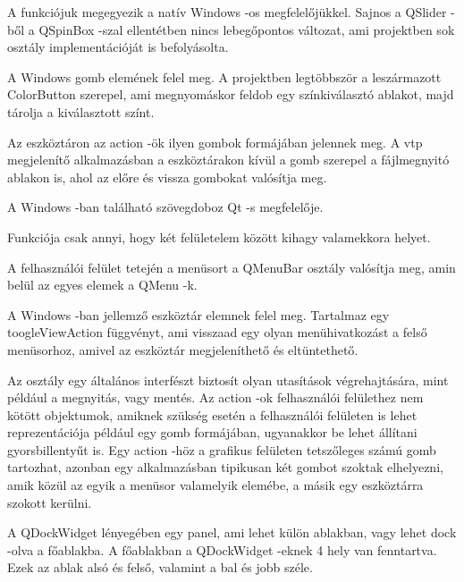 \begin{sloppypar}
\begin{description}[font=\normalfont\itshape\space]
\item [QLabel, QSlider, QSpinBox, QCheckBox, QComboBox:] 
A funkciójuk megegyezik a natív Windows -os megfelelőjükkel. 
Sajnos a QSlider -ből a QSpinBox -szal ellentétben nincs lebegőpontos változat, 
ami projektben sok osztály implementációját is befolyásolta.
\item [QPushButton:] 
A Windows gomb elemének felel meg. 
A projektben legtöbbször a leszármazott {\ttfamily ColorButton} szerepel, 
ami megnyomáskor feldob egy színkiválasztó ablakot, 
majd tárolja a kiválasztott színt.
\item [QToolButton:] 
Az eszköztáron az action -ök ilyen gombok formájában jelennek meg. 
A vtp megjelenítő alkalmazásban a eszköztárakon kívül 
a gomb szerepel a fájlmegnyitó ablakon is, 
ahol az előre és vissza gombokat valósítja meg.
\item [QLineEdit:] 
A Windows -ban található szövegdoboz Qt -s megfelelője.
\item [Spacer:] 
Funkciója csak annyi, hogy két felületelem között kihagy valamekkora helyet.
\item [QMenuBar, QMenu:] 
A felhasználói felület tetején a menüsort a {\ttfamily QMenuBar} osztály valósítja meg, 
amin belül az egyes elemek a {\ttfamily QMenu} -k.
\item [QToolBar:] A Windows -ban jellemző eszköztár elemnek felel meg. 
Tartalmaz egy {\ttfamily toogleViewAction} függvényt, 
ami visszaad egy olyan menühivatkozást a felső menüsorhoz, 
amivel az eszköztár megjeleníthető és eltüntethető.
\item [QAction:] 
Az osztály egy általános interfészt biztosít olyan utasítások végrehajtására, 
mint például a megnyitás, 
vagy mentés. 
Az action -ok felhasználói felülethez nem kötött objektumok, 
amiknek szükség esetén a felhasználói felületen is 
lehet reprezentációja például egy gomb formájában, 
ugyanakkor be lehet állítani gyorsbillentyűt is. 
Egy action -höz a grafikus felületen tetszőleges számú gomb tartozhat, 
azonban egy alkalmazásban tipikusan két gombot szoktak elhelyezni, 
amik közül az egyik a menüsor valamelyik elemébe, 
a másik egy eszköztárra szokott kerülni. 
\item [QDockWidget:] A {\ttfamily QDockWidget} lényegében egy panel, 
ami lehet külön ablakban, 
vagy lehet dock -olva a főablakba. 
A főablakban a {\ttfamily QDockWidget} -eknek 4 hely van fenntartva. 
Ezek az ablak alsó és felső, valamint a bal és jobb széle. 

\end{description}
\end{sloppypar}

